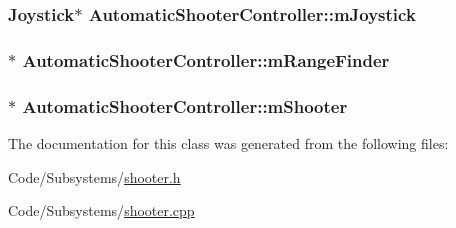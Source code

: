 \hypertarget{class_automatic_shooter_controller_a165a8c597fbcee1444fbcd7480f531ee}{
\subsubsection[{m\-Joystick}]{\setlength{\rightskip}{0pt plus 5cm}\-Joystick$\ast$ {\bf \-Automatic\-Shooter\-Controller\-::m\-Joystick}}}\label{class_automatic_shooter_controller_a165a8c597fbcee1444fbcd7480f531ee}
\hypertarget{class_automatic_shooter_controller_a78b436c9b1d561a3b370d17bb73dbdef}{
\subsubsection[{m\-Range\-Finder}]{$\ast$ {\bf \-Automatic\-Shooter\-Controller\-::m\-Range\-Finder}}}\label{class_automatic_shooter_controller_a78b436c9b1d561a3b370d17bb73dbdef}
\hypertarget{class_automatic_shooter_controller_aa227a7071f58aef7e30521fa563eebb0}{
\subsubsection[{m\-Shooter}]{$\ast$ {\bf \-Automatic\-Shooter\-Controller\-::m\-Shooter}}}\label{class_automatic_shooter_controller_aa227a7071f58aef7e30521fa563eebb0}


\-The documentation for this class was generated from the following files\-:\begin{DoxyCompactItemize}
\item 
\-Code/\-Subsystems/\hyperlink{shooter_8h}{shooter.\-h}\item 
\-Code/\-Subsystems/\hyperlink{shooter_8cpp}{shooter.\-cpp}\end{DoxyCompactItemize}
